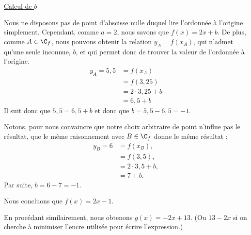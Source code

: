 {	\underline{Calcul de $b$}
	
	Nous ne disposons pas de point d'abscisse nulle duquel lire l'ordonnée à l'origine simplement.
	Cependant, comme $a =2$, nous savons que $f(x) = 2x+b$.
	De plus, comme $A\in\C_f$, nous pouvons obtenir la relation $y_A = f(x_A)$, qui n'admet qu'une seule inconnue, $b$, et qui permet donc de trouver la valeur de l'ordonnée à l'origine.
	\begin{align*}
		y_A = 5,5 &= f(x_A) \\
					&= f(3,25) \\
					&= 2\cdot3,25 + b \\
					&= 6,5 + b
	\end{align*}
	Il suit donc que $5,5 = 6,5+b$ et donc que $b = 5,5-6,5 = -1$.
	
	Notons, pour nous convaincre que notre choix arbitraire de point n'influe pas le résultat, que le même raisonnement avec $B\in\C_f$ donne le même résultat :
	\begin{align*}
		y_B = 6 &= f(x_B), \\
					&= f(3,5), \\
					&= 2\cdot3,5 + b, \\
					&= 7 + b.
	\end{align*}
	Par suite, $b = 6-7 = -1$.
	
	Nous concluons que $f(x) = 2x - 1$.
	
	
	En procédant similairement, nous obtenons $g(x) = -2x + 13$. (Ou $13-2x$ si on cherche à minimiser l'encre utilisée pour écrire l'expression.)
}



